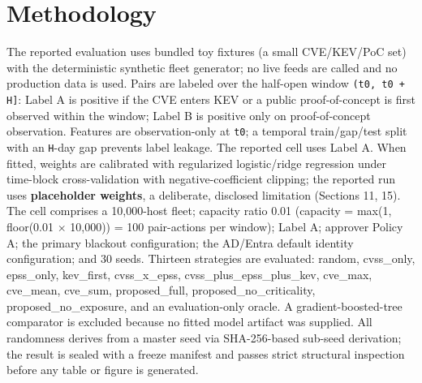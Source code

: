 \section{Methodology}

The reported evaluation uses bundled toy fixtures (a small CVE/KEV/PoC set) with
the deterministic synthetic fleet generator; no live feeds are called and no
production data is used. Pairs are labeled over the half-open window
\texttt{(t0, t0 + H]}: Label A is positive if the CVE enters KEV or a public
proof-of-concept is first observed within the window; Label B is positive only on
proof-of-concept observation. Features are observation-only at \texttt{t0}; a temporal
train/gap/test split with an \texttt{H}-day gap prevents label leakage. The reported cell
uses Label A. When fitted, weights are calibrated with regularized logistic/ridge
regression under time-block cross-validation with negative-coefficient clipping;
the reported run uses \textbf{placeholder weights}, a deliberate, disclosed limitation
(Sections 11, 15). The cell comprises a 10,000-host fleet; capacity ratio 0.01
(capacity = max(1, floor(0.01 $\times$ 10,000)) = 100 pair-actions per window); Label A;
approver Policy A; the primary blackout configuration; the AD/Entra default
identity configuration; and 30 seeds. Thirteen strategies are evaluated: random,
cvss\_only, epss\_only, kev\_first, cvss\_x\_epss, cvss\_plus\_epss\_plus\_kev, cve\_max,
cve\_mean, cve\_sum, proposed\_full, proposed\_no\_criticality, proposed\_no\_exposure,
and an evaluation-only oracle. A gradient-boosted-tree comparator is excluded
because no fitted model artifact was supplied. All randomness derives from a master
seed via SHA-256-based sub-seed derivation; the result is sealed with a freeze
manifest and passes strict structural inspection before any table or figure is
generated.
